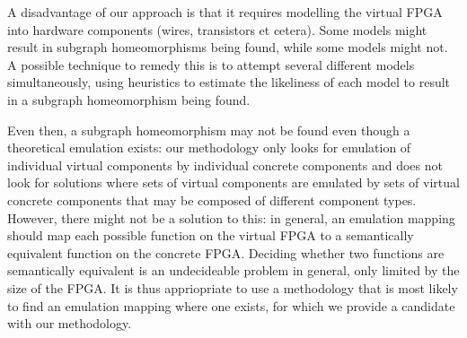 A disadvantage of our approach is that it requires modelling the virtual FPGA into hardware components (wires, transistors et cetera). Some models might result in subgraph homeomorphisms being found, while some models might not. A possible technique to remedy this is to attempt several different models simultaneously, using heuristics to estimate the likeliness of each model to result in a subgraph homeomorphism being found.

Even then, a subgraph homeomorphism may not be found even though a theoretical emulation exists: our methodology only looks for emulation of individual virtual components by individual concrete components and does not look for solutions where sets of virtual components are emulated by sets of virtual concrete components that may be composed of different component types. However, there might not be a solution to this: in general, an emulation mapping should map each possible function on the virtual FPGA to a semantically equivalent function on the concrete FPGA. Deciding whether two functions are semantically equivalent is an undecideable problem in general, only limited by the size of the FPGA. It is thus appriopriate to use a methodology that is most likely to find an emulation mapping where one exists, for which we provide a candidate with our methodology.